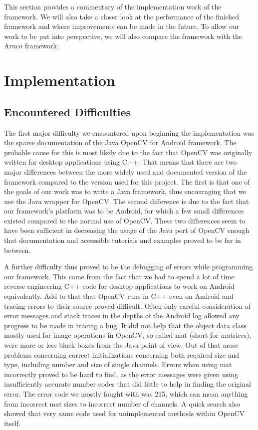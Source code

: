 This section provides a commentary of the implementation work of the framework.
We will also take a closer look at the performance of the finished framework and where improvements can be made in the future.
To allow our work to be put into perspective, we will also compare the framework with the Aruco framework.

\section{Implementation}
\label{implementation}

\subsection{Encountered Difficulties}

The first major difficulty we encountered upon beginning the implementation was the sparse documentation of the Java OpenCV for Android framework.
The probable cause for this is most likely due to the fact that OpenCV was originally written for desktop applications using C++.
That means that there are two major differences between the more widely used and documented version of the framework compared to the version used for this project.
The first is that one of the goals of our work was to write a Java framework, thus encouraging that we use the Java wrapper for OpenCV.
The second difference is due to the fact that our framework's platform was to be Android, for which a few small differences existed compared to the normal use of OpenCV.
These two differences seem to have been sufficient in decreasing the usage of the Java port of OpenCV enough that documentation and accessible tutorials and examples proved to be far in between.

A further difficulty thus proved to be the debugging of errors while programming our framework.
This came from the fact that we had to spend a lot of time reverse engineering C++ code for desktop applications to work on Android equivalently.
Add to that that OpenCV runs in C++ even on Android and tracing errors to their source proved difficult.
Often only careful consideration of error messages and stack traces in the depths of the Android log allowed any progress to be made in tracing a bug.
It did not help that the object data class mostly used for image operations in OpenCV, so-called mat (short for matrices), were more or less black boxes from the Java point of view.
Out of that arose problems concerning correct initializations concerning both required size and type, including number and size of single channels.
Errors when using mat incorrectly proved to be hard to find, as the error messages were given using insufficiently accurate number codes that did little to help in finding the original error.
The error code we mostly fought with was 215, which can mean anything from incorrect mat sizes to incorrect number of channels.
A quick search also showed that very same code used for unimplemented methods within OpenCV itself.

